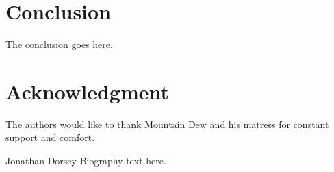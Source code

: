 \documentclass[journal]{IEEEtran}
\begin{document}
\section{Conclusion}
The conclusion goes here.


%
%


\section*{Acknowledgment}


The authors would like to thank Mountain Dew and his matress for constant support and comfort.



\ifCLASSOPTIONcaptionsoff
  \newpage
\fi



%
%
%
%
\cite{craig_introduction_2005}
\cite{khalil_nonlinear_2002}
\cite{rawlings_model_2017}
\cite{armstrong_explicit_1986}
\cite{ogata_modern_2010}
\cite{meriam_engineering_1993}
\cite{greenwood_advanced_2006}
\cite{borrelli_predictive_2017}
\cite{boyd_convex_2004}
\cite{slotine_applied_1991}

\printbibliography

\begin{IEEEbiographynophoto}{Jonathan Dorsey}
Biography text here.
\end{IEEEbiographynophoto}
\end{document}

